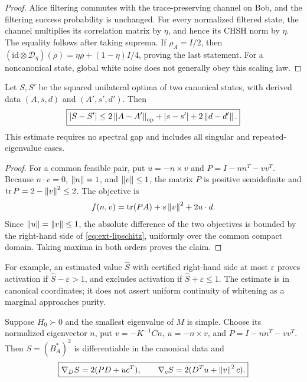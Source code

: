 \begin{proof}
Alice filtering commutes with the trace-preserving channel on Bob,
and the filtering success probability is unchanged.
For every normalized filtered state, the channel multiplies its
correlation matrix by $\eta$, and hence its CHSH norm by $\eta$.
The equality follows after taking suprema.
If $\rho_A=I/2$, then
$(\mathrm{id}\otimes\mathcal D_\eta)(\rho)
=\eta\rho+(1-\eta)I/4$, proving the last statement.
For a noncanonical state, global white noise does not generally
obey this scaling law.
\end{proof}

\begin{proposition}
\label{prop:ext-lipschitz}
Let $S,S'$ be the squared unilateral optima of two canonical states,
with derived data $(A,s,d)$ and $(A',s',d')$. Then
\begin{equation}
 \boxed{
 |S-S'|\le
 2\left\lVert A-A'\right\rVert_{\mathrm{op}}+|s-s'|+2\left\lVert d-d'\right\rVert.
 }
 \label{eq:ext-lipschitz}
\end{equation}
This estimate requires no spectral gap and includes all singular
and repeated-eigenvalue cases.
\end{proposition}

\begin{proof}
For a common feasible pair, put $u=-n\times v$ and
$P=I-nn^T-vv^T$. Because $n\cdot v=0$, $\left\lVert n\right\rVert=1$, and
$\left\lVert v\right\rVert\le1$, the matrix $P$ is positive semidefinite and
$\operatorname{tr} P=2-\left\lVert v\right\rVert^2\le2$. The objective is
\[
 f(n,v)=\operatorname{tr}(PA)+s\left\lVert v\right\rVert^2+2u\cdot d.
\]
Since $\left\lVert u\right\rVert=\left\lVert v\right\rVert\le1$, the absolute difference of the
two objectives is bounded by the right-hand side of
\eqref{eq:ext-lipschitz}, uniformly over the common compact domain.
Taking maxima in both orders proves the claim.
\end{proof}

For example, an estimated value $\widehat S$ with certified right-hand
side at most $\varepsilon$ proves activation if
$\widehat S-\varepsilon>1$, and excludes activation if
$\widehat S+\varepsilon\le1$.
The estimate is in canonical coordinates; it does not assert uniform
continuity of whitening as a marginal approaches purity.

\begin{proposition}
\label{prop:ext-gradient}
Suppose $H_0\succ0$ and the smallest eigenvalue of $M$ is simple.
Choose its normalized eigenvector $n$, put
$v=-K^{-1}Cn$, $u=-n\times v$, and
$P=I-nn^T-vv^T$. Then $S=(B_A^*)^2$ is differentiable in the
canonical data and
\begin{equation}
 \boxed{
 \nabla_D S=2(PD+uc^T),\qquad
 \nabla_c S=2(D^Tu+\left\lVert v\right\rVert^2c).
 }
 \label{eq:ext-gradients}
\end{equation}
\end{proposition}

